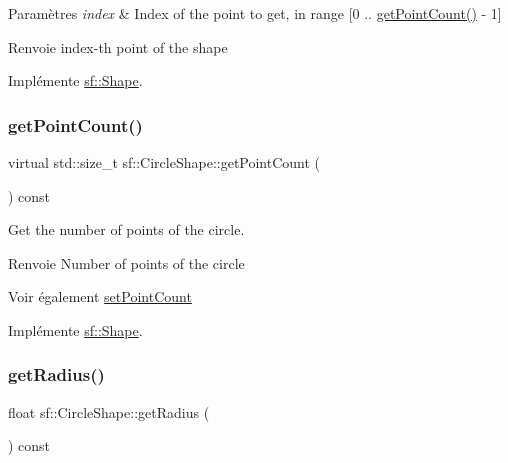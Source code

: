 \begin{DoxyParams}{Paramètres}
{\em index} & Index of the point to get, in range \mbox{[}0 .. \hyperlink{classsf_1_1CircleShape_a014d29ec11e8afa4dce50e7047d99601}{get\+Point\+Count()} -\/ 1\mbox{]}\\
\hline
\end{DoxyParams}
\begin{DoxyReturn}{Renvoie}
index-\/th point of the shape 
\end{DoxyReturn}


Implémente \hyperlink{classsf_1_1Shape_a40e5d83713eb9f0c999944cf96458085}{sf\+::\+Shape}.

\mbox{\label{classsf_1_1CircleShape_a014d29ec11e8afa4dce50e7047d99601}} 
\subsubsection{\texorpdfstring{get\+Point\+Count()}{getPointCount()}}
{\footnotesize\ttfamily virtual std\+::size\+\_\+t sf\+::\+Circle\+Shape\+::get\+Point\+Count (\begin{DoxyParamCaption}{ }\end{DoxyParamCaption}) const\hspace{0.3cm}{\ttfamily [virtual]}}



Get the number of points of the circle. 

\begin{DoxyReturn}{Renvoie}
Number of points of the circle
\end{DoxyReturn}
\begin{DoxySeeAlso}{Voir également}
\hyperlink{classsf_1_1CircleShape_a16590ee7bdf5c9f752275468a4997bed}{set\+Point\+Count} 
\end{DoxySeeAlso}


Implémente \hyperlink{classsf_1_1Shape_af988dd61a29803fc04d02198e44b5643}{sf\+::\+Shape}.

\mbox{\label{classsf_1_1CircleShape_aa3dd5a1b5031486ce5b6f09d43674aa3}} 
\subsubsection{\texorpdfstring{get\+Radius()}{getRadius()}}
{\footnotesize\ttfamily float sf\+::\+Circle\+Shape\+::get\+Radius (\begin{DoxyParamCaption}{ }\end{DoxyParamCaption}) const}



